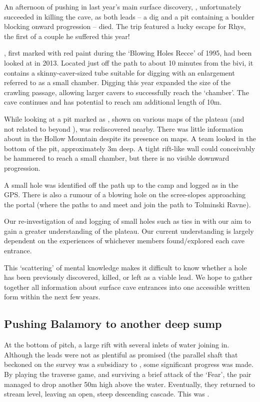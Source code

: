 An afternoon of pushing in last year’s main surface discovery, , unfortunately succeeded in killing the cave, as both leads – a dig and a pit containing a boulder blocking onward progression – died. The trip featured a lucky escape for Rhys, the first of a couple he suffered this year!

, first marked with red paint during the ‘Blowing Holes Recce’ of 1995, had been looked at in 2013. Located just off the path to  about 10 minutes from the bivi, it contains a skinny-caver-sized tube suitable for digging with an enlargement referred to as a small chamber. Digging this year expanded the size of the crawling passage, allowing larger cavers to successfully reach the ‘chamber’. The cave continues and  has potential to reach am additional length of 10m.

While looking at  a pit marked as , shown on various maps of the plateau (and not related to  beyond ), was rediscovered nearby. There was little information about  in the Hollow Mountain despite its presence on maps. A team looked in the bottom of the pit, approximately 3m deep. A tight rift-like wall could conceivably be hammered to reach a small chamber, but there is no visible downward progression. 

A small hole was identified off the path up to the camp and logged as  in the GPS. There is also a rumour of a blowing hole on the scree-slopes approaching the portal (where the paths to  and  meet and join the path to Tolminski Ravne).


Our re-investigation of  and logging of small holes such as  ties in with our aim to gain a greater understanding of the plateau. Our current understanding is largely dependent on the experiences of whichever members found/explored each cave entrance.

This ‘scattering’ of mental knowledge makes it difficult to know whether a hole has been previously discovered, killed, or left as a viable lead. We hope to gather together all information about surface cave entrances into one accessible written form within the next few years.


\subsection{Pushing Balamory to another deep sump}
 At the bottom of  pitch, a large rift with several inlets of water joining in.  Although the leads were not as plentiful as promised (the parallel shaft that beckoned on the survey was a subsidiary to , some significant progress was made. By playing the traverse game, and surviving a brief attack of the ‘Fear', the pair managed to drop another 50m high above the water. Eventually, they returned to stream level, leaving an open, steep descending cascade. This was .

